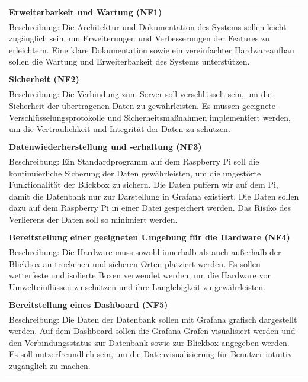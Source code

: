 \documentclass[
]{article}
\begin{document}
\begin{center}
  \begin{tabular}{|p{\linewidth}|}
    \hline
    \textbf{Erweiterbarkeit und Wartung (NF1)} \\
    Beschreibung: Die Architektur und Dokumentation des Systems sollen leicht zugänglich sein, um Erweiterungen und Verbesserungen der Features zu erleichtern.
    Eine klare Dokumentation sowie ein vereinfachter Hardwareaufbau sollen die Wartung und Erweiterbarkeit des Systems unterstützen. \\ \\
    \hline
    \textbf{Sicherheit (NF2)} \\
    Beschreibung: Die Verbindung zum Server soll verschlüsselt sein, um die Sicherheit der übertragenen Daten zu gewährleisten.
    Es müssen geeignete Verschlüsselungsprotokolle und Sicherheitsmaßnahmen implementiert werden, um die Vertraulichkeit und Integrität der Daten zu schützen.\\ \\
    \hline
    \textbf{Datenwiederherstellung und -erhaltung (NF3)} \\
    Beschreibung: Ein Standardprogramm auf dem Raspberry Pi soll die kontinuierliche Sicherung der Daten gewährleisten, um die ungestörte Funktionalität der Blickbox zu sichern.
    Die Daten puffern wir auf dem Pi, damit die Datenbank nur zur Darstellung in Grafana existiert.
    Die Daten sollen dazu auf dem Raspberry Pi in einer Datei gespeichert werden.
    Das Risiko des Verlierens der Daten soll so minimiert werden.\\ \\
    \hline
    \textbf{Bereitstellung einer geeigneten Umgebung für die Hardware (NF4)} \\
    Beschreibung: Die Hardware muss sowohl innerhalb als auch außerhalb der Blickbox an trockenen und sicheren Orten platziert werden.
    Es sollen wetterfeste und isolierte Boxen verwendet werden, um die Hardware vor Umwelteinflüssen zu schützen und ihre Langlebigkeit zu gewährleisten.\\ \\
    \hline
    \textbf{Bereitstellung eines Dashboard (NF5)} \\
    Beschreibung: Die Daten der Datenbank sollen mit Grafana grafisch dargestellt werden.
    Auf dem Dashboard sollen die Grafana-Grafen visualisiert werden und den Verbindungsstatus zur Datenbank sowie zur Blickbox angegeben werden.
    Es soll nutzerfreundlich sein, um die Datenvisualisierung für Benutzer intuitiv zugänglich zu machen.
    \\ \\
    \hline
  \end{tabular}
\end{center}
\end{document}
